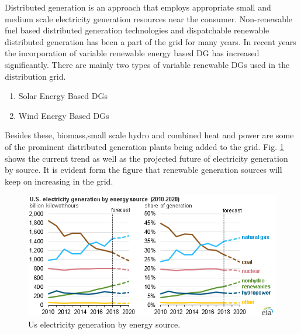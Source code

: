 Distributed generation is an approach that employs appropriate small and medium scale electricity generation resources near the consumer. Non-renewable fuel based distributed generation technologies and dispatchable renewable distributed generation has been a part of the grid for many years. In recent years the incorporation of variable renewable energy based DG has increased significantly. There are mainly two types of variable renewable DGs used in the distribution grid.
\begin{enumerate}
    \item Solar Energy Based DGs
    \item Wind Energy Based DGs
\end{enumerate}
Besides these, biomass,small scale hydro and combined heat and power are some of the prominent distributed generation plants being added to the grid. Fig. \ref{fig:GROWTH_EIA} shows the current trend as well as the projected future of electricity generation by source. It is evident form the figure that renewable generation sources will keep on increasing in the grid. 

\begin{figure}[!h]
\centering
\includegraphics[width=0.85\linewidth]{figs/GROWTH_EIA.png}
\caption[Us electricity generation by energy source.]{Us electricity generation by energy source.\cite{EIA2018}}
\label{fig:GROWTH_EIA}
\end{figure}

